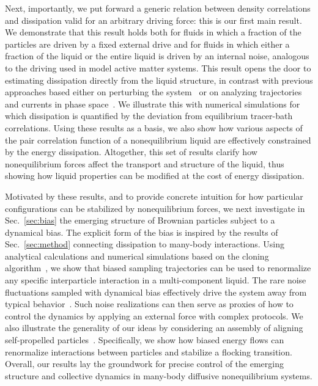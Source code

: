 \documentclass[superscriptaddress, twocolumn, prx, longbibliography, nofootinbib]{revtex4-1}
\begin{document}
Next, importantly, we put forward a generic relation between density correlations and dissipation valid for an arbitrary driving force: this is our first main result. We demonstrate that this result holds both for fluids in which a fraction of the particles are driven by a fixed external drive and for fluids in which either a fraction of the liquid or the entire liquid is driven by an internal noise, analogous to the driving used in model active matter systems. This result opens the door to estimating dissipation directly from the liquid structure, in contrast with previous approaches based either on perturbing the system~\cite{Harada2005, Mizuno2007, Visco2015, Turlier2016, Ahmed2018} or on analyzing trajectories and currents in phase space~\cite{Battle604, Gingrich2017, Roldan2018, Parrondo2018, Li2018}. We illustrate this with numerical simulations for which dissipation is quantified by the deviation from equilibrium tracer-bath correlations. Using these results as a basis, we also show how various aspects of the pair correlation function of a nonequilibrium liquid are effectively constrained by the energy dissipation. Altogether, this set of results clarify how nonequilibrium forces affect the transport and structure of the liquid, thus showing how liquid properties can be modified at the cost of energy dissipation.


Motivated by these results, and to provide concrete intuition for how particular configurations can be stabilized by nonequilibrium forces, we next investigate in Sec.~\ref{sec:bias} the emerging structure of Brownian particles subject to a dynamical bias. The explicit form of the bias is inspired by the results of Sec.~\ref{sec:method} connecting dissipation to many-body interactions. Using analytical calculations and numerical simulations based on the cloning algorithm~\cite{Giadina2006, tailleur2007probing, Hurtado2009, Nemoto2016, Ray2018, Klymko2018, Brewer2018}, we show that biased sampling trajectories can be used to renormalize any specific interparticle interaction in a multi-component liquid. The rare noise fluctuations sampled with dynamical bias effectively drive the system away from typical behavior~\cite{garrahan2007, Hedges2009, Jack2010, Pitard2011, Speck2012, Bodineau2012a, Chetrite2013, Limmer2014, Nemoto2017}. Such noise realizations can then serve as proxies of how to control the dynamics by applying an external force with complex protocols. We also illustrate the generality of our ideas by considering an assembly of aligning self-propelled particles~\cite{Farrell2012}. Specifically, we show how biased energy flows can renormalize interactions between particles and stabilize a flocking transition. Overall, our results lay the groundwork for precise control of the emerging structure and collective dynamics in many-body diffusive nonequilibrium systems.
\end{document}
